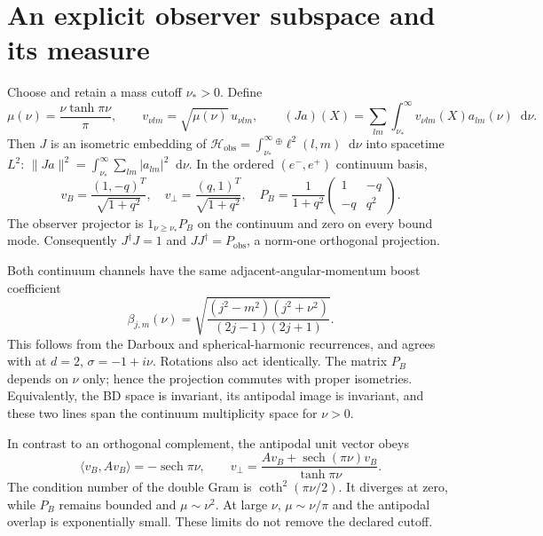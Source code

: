 \documentclass[11pt,a4paper]{article}
\newcommand{\dd}{\mathop{}\!\mathrm d}
\newcommand{\sech}{\operatorname{sech}}
\newcommand{\HH}{\mathcal H}
\begin{document}
\section{An explicit observer subspace and its measure}
Choose and retain a mass cutoff $\nu_*>0$. Define
\begin{equation}
 \mu(\nu)=\frac{\nu\tanh\pi\nu}{\pi},\qquad
 v_{\nu lm}=\sqrt{\mu(\nu)}\,u_{\nu lm},\qquad
 (Ja)(X)=\sum_{lm}\int_{\nu_*}^\infty v_{\nu lm}(X)a_{lm}(\nu)\dd\nu.
 \label{eq:J}
\end{equation}
Then $J$ is an isometric embedding of
$\HH_{\mathrm{obs}}=\int_{\nu_*}^\infty{}^\oplus\ell^2(l,m)\dd\nu$
into spacetime $L^2$:
$\|Ja\|^2=\int_{\nu_*}^\infty\sum_{lm}|a_{lm}|^2\dd\nu$.
In the ordered $(e^-,e^+)$ continuum basis,
\begin{equation}
 v_B=\frac{(1,-q)^T}{\sqrt{1+q^2}},\quad
 v_\perp=\frac{(q,1)^T}{\sqrt{1+q^2}},\quad
 P_B=\frac1{1+q^2}\begin{pmatrix}1&-q\\-q&q^2\end{pmatrix}.
\end{equation}
The observer projector is $1_{\nu\geq\nu_*}P_B$ on the continuum and
zero on every bound mode. Consequently $J^\dagger J=1$ and
$JJ^\dagger=P_{\mathrm{obs}}$, a norm-one orthogonal projection.

Both continuum channels have the same adjacent-angular-momentum
boost coefficient
\begin{equation}
 \beta_{j,m}(\nu)=
 \sqrt{\frac{(j^2-m^2)(j^2+\nu^2)}{(2j-1)(2j+1)}} .
\end{equation}
This follows from the Darboux and spherical-harmonic recurrences, and
agrees with \cite[eqs.\ (20)--(21)]{MM} at $d=2$, $\sigma=-1+i\nu$.
Rotations also act identically. The matrix $P_B$ depends on $\nu$ only;
hence the projection commutes with proper isometries. Equivalently, the
BD space is invariant, its antipodal image is invariant, and these two
lines span the continuum multiplicity space for $\nu>0$.

In contrast to an orthogonal complement, the antipodal unit vector obeys
\begin{equation}
 \langle v_B,Av_B\rangle=-\sech\pi\nu,\qquad
 v_\perp=\frac{Av_B+\sech(\pi\nu)v_B}{\tanh\pi\nu}.
 \label{eq:antipode}
\end{equation}
The condition number of the double Gram is $\coth^2(\pi\nu/2)$.
It diverges at zero, while $P_B$ remains bounded and $\mu\sim\nu^2$.
At large $\nu$, $\mu\sim\nu/\pi$ and the antipodal overlap is
exponentially small. These limits do not remove the declared cutoff.
\end{document}
